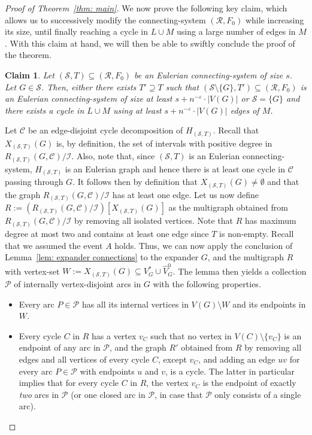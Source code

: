 \documentclass[11pt,reqno]{article}
\newtheorem{claim}[theorem]{Claim}
\newenvironment{claimproof}[1][\proofname]{\proof[#1]\renewcommand{\qedsymbol}{$\blacksquare$}}{\endproof}
\begin{document}
\begin{proof}[Proof of Theorem~\ref{thm: main}]
  We now prove the following key claim, which allows us to successively modify the connecting-system $(\mathcal{R},F_0)$ while increasing its size, until finally reaching a cycle in $L\cup M$ using a large number of edges in $M$. With this claim at hand, we will then be able to swiftly conclude the proof of the theorem.
  \begin{claim}\label{clm: iterative}
      Let $(\mathcal S,T)\subseteq (\mathcal R,F_0)$ be an Eulerian connecting-system of size $s$. Let $G\in\mathcal S$. Then, either there exists $T'\supseteq T$ such that $(\mathcal S\setminus \{G\},T')\subseteq (\mathcal R,F_0)$ is an Eulerian connecting-system of size at least $s+n^{-\varepsilon}\cdot |V(G)|$ or $\mathcal S=\{G\}$ and there exists a cycle in $L\cup M$ using at least $s+n^{-\varepsilon}\cdot |V(G)|$ edges of $M$.
  \end{claim}
  \begin{claimproof}
    Let $\mathcal C$ be an edge-disjoint cycle decomposition of $H_{(\mathcal S,T)}$. Recall that $X_{(\mathcal S,T)}(G)$ is, by definition, the set of intervals with positive degree in $R_{(\mathcal S,T)}(G,\mathcal C)\slash\mathcal I$. Also, note that, since $(\mathcal S, T)$ is an Eulerian connecting-system, $H_{(\mathcal S, T)}$ is an Eulerian graph and hence there is at least one cycle in $\mathcal C$ passing through $G$. It follows then by definition that $X_{(\mathcal S,T)}(G)\neq \emptyset$ and that the graph $R_{(\mathcal S,T)}(G,\mathcal C)\slash\mathcal I$ has at least one edge. Let us now define $R:=(R_{(\mathcal S,T)}(G,\mathcal C)\slash\mathcal I)[X_{(\mathcal S,T)}(G)]$ as the multigraph obtained from $R_{(\mathcal S,T)}(G,\mathcal C)\slash\mathcal I$ by removing all isolated vertices. Note that $R$ has maximum degree at most two and contains at least one edge since $T$ is non-empty. Recall that we assumed the event $A$ holds. Thus, we can now apply the conclusion of Lemma~\ref{lem: expander connections} to the expander $G$, and the multigraph $R$ with vertex-set $W:=X_{(\mathcal S,T)}(G)\subseteq V_G^\ast\cup \hat V_G^0$. The lemma then yields a collection $\mathcal P$ of internally vertex-disjoint arcs in $G$ with the following properties.
    \begin{itemize}
    \item Every arc $P\in \mathcal P$ has all its internal vertices in $V(G)\setminus W$ and its endpoints in $W$. 
        \item Every cycle $C$ in $R$ has a vertex $v_C$ such that no vertex in $V(C)\setminus \{v_C\}$ is an endpoint of any arc in $\mathcal P$, and the graph $R'$ obtained from $R$ by removing all edges and all vertices of every cycle $C$, except $v_C$, and adding an edge $uv$ for every arc $P\in \mathcal{P}$ with endpoints $u$ and $v$, is a cycle. The latter in particular implies that for every cycle $C$ in $R$, the vertex $v_C$ is the endpoint of exactly \emph{two} arcs in $\mathcal P$ (or one closed arc in $\mathcal P$, in case that $\mathcal P$ only consists of a single arc).

\end{itemize}
\end{claimproof}
\end{proof}
\end{document}
